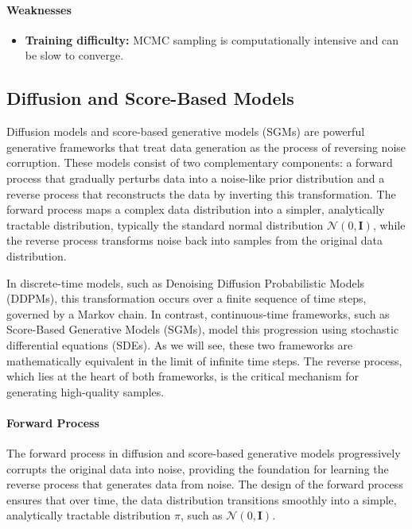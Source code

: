 \paragraph{Weaknesses}
\begin{itemize}
    \item \textbf{Training difficulty:} MCMC sampling is computationally intensive and can be slow to converge.
\end{itemize}

\subsection{Diffusion and Score-Based Models}

Diffusion models \cite{ho2020denoising} and score-based generative models (SGMs) \cite{song2021sde} are powerful generative frameworks that treat data generation as the process of reversing noise corruption. These models consist of two complementary components: a forward process that gradually perturbs data into a noise-like prior distribution and a reverse process that reconstructs the data by inverting this transformation. The forward process maps a complex data distribution into a simpler, analytically tractable distribution, typically the standard normal distribution \( \mathcal{N}(0, \mathbf{I}) \), while the reverse process transforms noise back into samples from the original data distribution.

In discrete-time models, such as Denoising Diffusion Probabilistic Models (DDPMs), this transformation occurs over a finite sequence of time steps, governed by a Markov chain. In contrast, continuous-time frameworks, such as Score-Based Generative Models (SGMs), model this progression using stochastic differential equations (SDEs). As we will see, these two frameworks are mathematically equivalent in the limit of infinite time steps. The reverse process, which lies at the heart of both frameworks, is the critical mechanism for generating high-quality samples.

\paragraph{Forward Process}

The forward process in diffusion and score-based generative models progressively corrupts the original data into noise, providing the foundation for learning the reverse process that generates data from noise. The design of the forward process ensures that over time, the data distribution transitions smoothly into a simple, analytically tractable distribution $\pi$, such as \( \mathcal{N}(0, \mathbf{I}) \).

